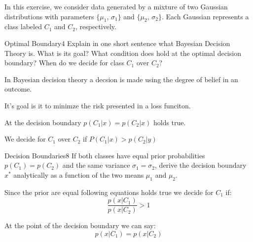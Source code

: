 \newif\ifvimbug
\vimbugfalse

\ifvimbug

\fi

In this exercise, we consider data generated by a mixture of two Gaussian distributions with parameters $\{\mu_1$, $\sigma_1\}$ and $\{\mu_2$, $\sigma_2\}$. Each Gaussian represents a class labeled $C_1$ and $C_2$, respectively. 

\begin{questions}


\begin{question}{Optimal Boundary}{4}
Explain in one short sentence what Bayesian Decision Theory is. What is its goal? 
What condition does hold at the optimal decision boundary? When do we decide for class $C_1$ over $C_2$?

\begin{answer}
In Bayesian decision theory a decsion is made using the degree of belief in an outcome. 

It's goal is it to minimze the risk presented in a loss funciton.

At the decision boundary $p(C_1|x) = p(C_2|x)$ holds true.

We decide for $C_1$ over $C_2$ if $P(C_1|x) > p(C_2|y)$

\end{answer}

\end{question}



\begin{question}{Decision Boundaries}{8}
If both classes have equal prior probabilities $p(C_1) = p(C_2)$ and the same variance $\sigma_1 = \sigma_2$, derive the decision boundary $x^*$ analytically as a function of the two means $\mu_1$ and $\mu_2$.

\begin{answer}
Since the prior are equal following equations holds true we decide for $C_1$ if:
\begin{equation}
    \frac{p(x|C_1)}{p(x|C_2)} > 1
\end{equation}


At the point of the decision boundary we can say:
\begin{equation} \label{boundary}
	p(x|C_1) = p(x|C_2)
\end{equation}


\end{answer}
\end{question}
\end{questions}
